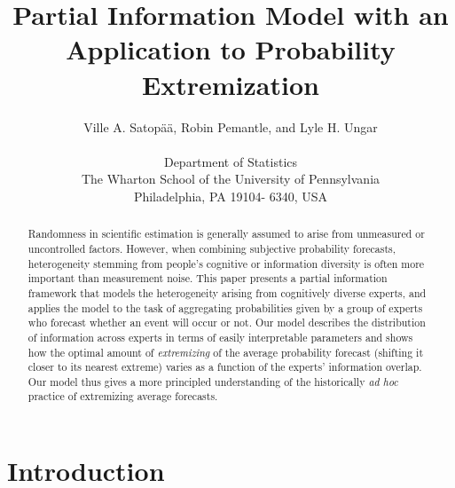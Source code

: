 \documentclass[11pt,twoside]{article}
\begin{document}
\title{Partial Information Model with an Application to Probability Extremization}
\author{
Ville A. Satop\"a\"a, Robin Pemantle, and Lyle H. Ungar\\
\\
 \small Department of Statistics\\
 \small The Wharton School of the University of Pennsylvania\\
 \small Philadelphia, PA 19104- 6340, USA\\ [-0.25in]} \date{}
\maketitle

\pagestyle{myheadings}
\thispagestyle{empty}

\begin{abstract}
Randomness in scientific estimation is generally assumed to arise from
unmeasured or uncontrolled factors. However, when combining subjective probability forecasts, heterogeneity
stemming from people's cognitive or information diversity is often
more important than measurement noise.  This paper presents a
partial information framework that models the heterogeneity arising
from cognitively diverse experts, and applies the model to the task of
aggregating probabilities given by a group of experts who forecast
whether an event will occur or not. Our model describes the
distribution of information across experts in terms of easily
interpretable parameters and shows how the optimal amount
of \textit{extremizing} of the average probability forecast (shifting
it closer to its nearest extreme) varies as a function of the experts'
information overlap.  Our model thus gives a more principled
understanding of the historically {\it ad hoc} practice of extremizing
average forecasts.
\end{abstract}



\section{Introduction}
\end{document}
